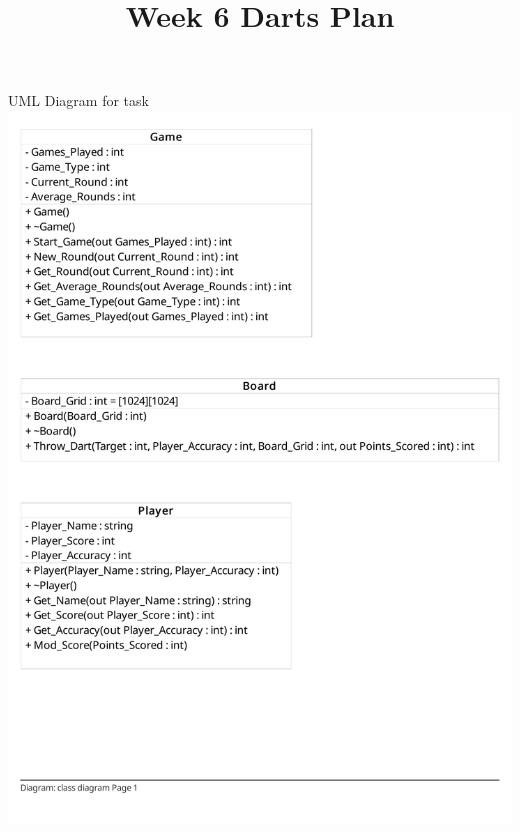 \documentclass[11pt, a4paper]{article}
\begin{document}
    \title{Week 6 Darts Plan}
    \author{}
    \date{}

    \pretitle{\begin{flushleft}\large}
    \posttitle{\par\end{flushleft}}

    \maketitle
    
    \begin{flushleft}
        \large UML Diagram for task 
        \linebreak
        \includegraphics{UMLDiagram.pdf}

        
    \end{flushleft}
\end{document}
